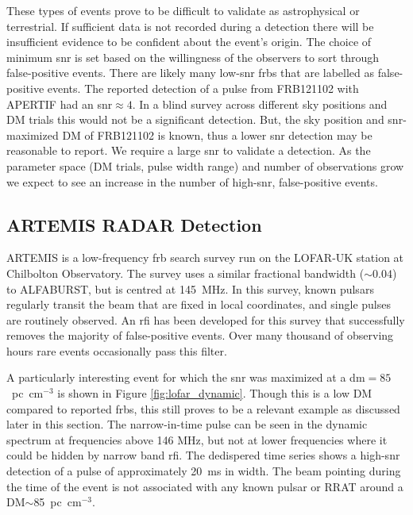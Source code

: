 \documentclass[a4paper,fleqn,usenatbib]{mnras}
\begin{document}
These types of events prove to be difficult to validate as astrophysical or
terrestrial. If sufficient data is not recorded during a detection there will be
insufficient evidence to be confident about the event's origin. The choice of
minimum \gls{snr} is set based on the willingness of the observers to sort
through false-positive events. There are likely many low-\gls{snr} \glspl{frb}
that are labelled as false-positive events.  The reported detection of a pulse
from FRB121102 with APERTIF \citep{atel10693} had an \gls{snr}$\approx 4$. In a
blind survey across different sky positions and DM trials this would not be a
significant detection. But, the sky position and \gls{snr}-maximized DM of
FRB121102 is known, thus a lower \gls{snr} detection may be reasonable to
report.  We require a large \gls{snr} to validate a detection.  As the parameter
space (DM trials, pulse width range) and number of observations grow we expect
to see an increase in the number of high-\gls{snr}, false-positive events.

\subsection{ARTEMIS RADAR Detection}
\label{sec:LOFAR_RADAR}

ARTEMIS \citep{2015MNRAS.452.1254K} is a low-frequency \gls{frb} search survey
run on the LOFAR-UK station at Chilbolton Observatory.  The survey uses a
similar fractional bandwidth ($\sim 0.04$) to ALFABURST, but is centred at
145~MHz.  In this survey, known pulsars regularly transit the beam that are
fixed in local coordinates, and single pulses are routinely observed.  An
\gls{rfi} has been developed for this survey that successfully removes the
majority of false-positive events. Over many thousand of observing hours rare
events occasionally pass this filter.

A particularly interesting event for which the \gls{snr} was maximized at a
\gls{dm}$= 85$~pc~cm$^{-3}$ is shown in Figure \ref{fig:lofar_dynamic}. Though
this is a low DM compared to reported \glspl{frb}, this still proves to be a
relevant example as discussed later in this section.  The narrow-in-time pulse
can be seen in the dynamic spectrum at frequencies above 146 MHz, but not at
lower frequencies where it could be hidden by narrow band \gls{rfi}.  The
dedispered time series shows a high-\gls{snr} detection of a pulse of
approximately 20~ms in width.
The beam pointing during the time of the event is not associated with any known
pulsar or RRAT around a DM$\sim$85~pc~cm$^{-3}$.
\end{document}
